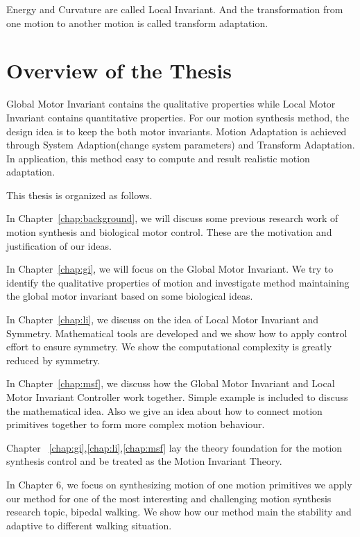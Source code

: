 Energy and Curvature are called Local Invariant. 
And the transformation from one motion to another motion is called transform adaptation.



\section{Overview of the Thesis}
Global Motor Invariant contains the qualitative properties while Local Motor Invariant contains quantitative properties. 
For our motion synthesis method, the design idea is to keep the both motor invariants. 
Motion Adaptation is achieved through System Adaption(change system parameters) and Transform Adaptation.
In application, this method easy to compute and result realistic motion adaptation.



This thesis is organized as follows.
 
In Chapter~\ref{chap:background}, we will discuss some previous research work of motion synthesis  and biological motor control. 
These are the motivation and justification of our ideas.
 
In Chapter~\ref{chap:gi}, we will focus on the Global Motor Invariant. 
We try to identify the qualitative properties of motion and investigate method maintaining the global motor invariant based on some biological ideas.

In Chapter~\ref{chap:li}, we discuss on the idea of Local Motor Invariant and Symmetry.
Mathematical tools are developed and we show how to apply control effort to ensure symmetry. 
We show the computational complexity is greatly reduced by symmetry.

In Chapter~\ref{chap:msf}, we discuss how the Global Motor Invariant and Local Motor Invariant Controller work together. 
Simple example is included to discuss the mathematical idea. 
Also we give an idea about how to connect motion primitives together to form more complex motion behaviour.

Chapter ~\ref{chap:gi},\ref{chap:li},\ref{chap:msf} lay the theory foundation for the motion synthesis control and be treated as the Motion Invariant Theory.


In Chapter 6, we focus on synthesizing motion of one motion primitives
 we apply our method for one of the most interesting and challenging motion synthesis research topic, bipedal walking. We show how our method main the stability and adaptive to different walking situation.


